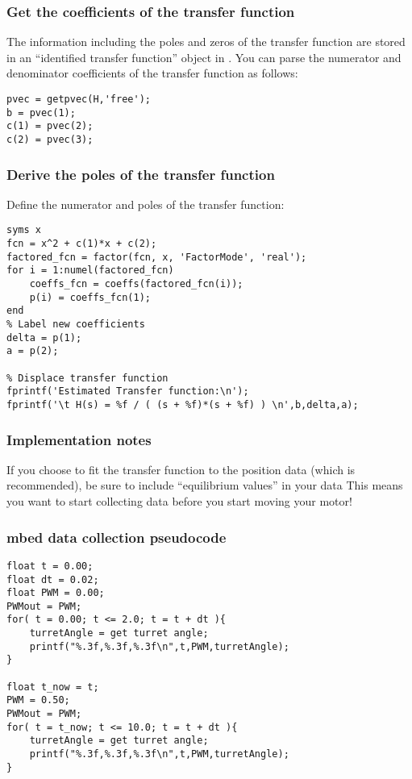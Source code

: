 \documentclass[aspectratio=169]{beamer}
\begin{document}
\begin{frame}[fragile]
\frametitle{Get the coefficients of the transfer function}
The information including the poles and zeros of the transfer function are stored in an ``identified transfer function'' object in \Matlab. You can parse the numerator and denominator coefficients of the transfer function as follows:
\begin{lstlisting}[style=usnaMatlab]
% Parse information from the identified transfer function object
pvec = getpvec(H,'free');
b = pvec(1);
c(1) = pvec(2);
c(2) = pvec(3);
\end{lstlisting}
\end{frame}

\begin{frame}[fragile]
\frametitle{Derive the poles of the transfer function}
Define the numerator and poles of the transfer function:
\begin{lstlisting}[style=usnaMatlab]
% Calculate the poles using algebraic manipulation
syms x
fcn = x^2 + c(1)*x + c(2);
factored_fcn = factor(fcn, x, 'FactorMode', 'real');
for i = 1:numel(factored_fcn)
    coeffs_fcn = coeffs(factored_fcn(i));
    p(i) = coeffs_fcn(1);
end
% Label new coefficients
delta = p(1);
a = p(2);
 
% Displace transfer function
fprintf('Estimated Transfer function:\n');
fprintf('\t H(s) = %f / ( (s + %f)*(s + %f) ) \n',b,delta,a);
\end{lstlisting}
\end{frame}

\begin{frame}
\frametitle{Implementation notes}
If you choose to fit the transfer function to the position data (which is recommended), be sure to include ``equilibrium values'' in your data
This means you want to start collecting data before you start moving your motor!
\end{frame}

\begin{frame}[fragile]
\frametitle{mbed data collection pseudocode}
\begin{lstlisting}[style=mbedC]
float t = 0.00;
float dt = 0.02;
float PWM = 0.00;
PWMout = PWM;
for( t = 0.00; t <= 2.0; t = t + dt ){
	turretAngle = get turret angle;
	printf("%.3f,%.3f,%.3f\n",t,PWM,turretAngle);
}

float t_now = t;
PWM = 0.50;
PWMout = PWM;
for( t = t_now; t <= 10.0; t = t + dt ){
	turretAngle = get turret angle;
	printf("%.3f,%.3f,%.3f\n",t,PWM,turretAngle);
}
\end{lstlisting}
\end{frame}
\end{document}
